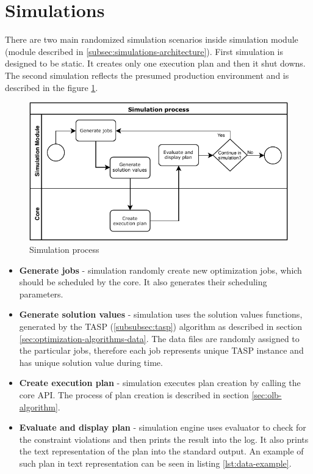 \section{Simulations}\label{sec:simulations}

There are two main randomized simulation scenarios inside simulation module 
(module described in \ref{subsec:simulations-architecture}).
First simulation is designed to be static.
It creates only one execution plan
and then it shut downs.
The second simulation reflects the presumed production environment
and is described in the figure \ref{fig:simulation-process}.

\begin{figure}[ht] 
	\includegraphics[width=\textwidth]{i_simulation_process.pdf} 
	\centering
	\caption{Simulation process}
	\label{fig:simulation-process}
\end{figure}

\begin{itemize}
	\item \textbf{Generate jobs} - simulation randomly create new optimization jobs, 
	      which should be scheduled by the core.
	      It also generates their scheduling parameters.
	\item \textbf{Generate solution values} - simulation uses the solution values functions,
	      generated by the TASP (\ref{subsubsec:tasp}) algorithm as described in section \ref{sec:optimization-algorithms-data}.
	      The data files are randomly assigned to the particular jobs, 
	      therefore each job represents unique TASP instance
	      and has unique solution value during time.
	\item \textbf{Create execution plan} - simulation executes plan creation by calling the core API.
	      The process of plan creation is described in section \ref{sec:olb-algorithm}.
	\item \textbf{Evaluate and display plan} - simulation engine uses evaluator to check for the constraint violations
	      and then prints the result into the log.
	      It also prints the text representation of the plan into the standard output. 
	      An example of such plan in text representation can be seen in listing \ref{lst:data-example}.
\end{itemize}

